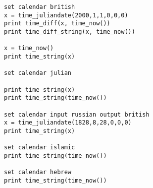 \begin{verbatim}
set calendar british
x = time_juliandate(2000,1,1,0,0,0)
print time_diff(x, time_now())
print time_diff_string(x, time_now())

x = time_now()
print time_string(x)

set calendar julian

print time_string(x)
print time_string(time_now())

set calendar input russian output british
x = time_juliandate(1828,8,28,0,0,0)
print time_string(x)

set calendar islamic
print time_string(time_now())

set calendar hebrew
print time_string(time_now())
\end{verbatim}



